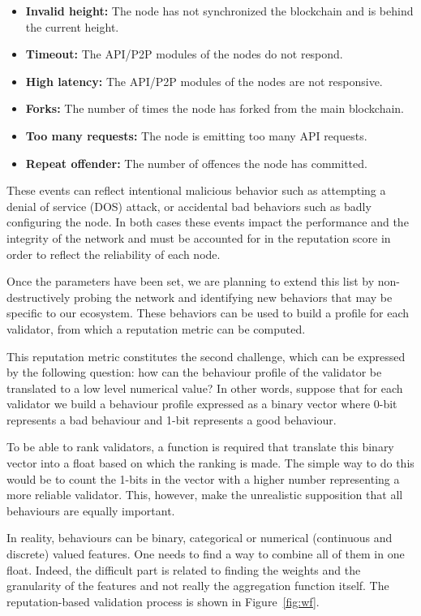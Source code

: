 \begin{itemize}
    \item \textbf{Invalid height:} The node has not synchronized the blockchain and is behind the current height. 
    \item \textbf{Timeout:} The API/P2P modules of the nodes do not respond.
    \item \textbf{High latency:} The API/P2P modules of the nodes are not responsive.
    \item \textbf{Forks:} The number of times the node has forked from the main blockchain.
    \item \textbf{Too many requests:} The node is emitting too many API requests.
    \item \textbf{Repeat offender:} The number of offences the node has committed.
\end{itemize}
 
These events can reflect intentional malicious behavior such as attempting a denial of service (DOS) attack, or accidental bad behaviors such as badly configuring the node. In both cases these events impact the performance and the integrity of the network and must be accounted for in the reputation score in order to reflect the reliability of each node.   

Once the parameters have been set, we are planning to extend this list by non-destructively probing the network and identifying new behaviors that may be specific to our ecosystem. These behaviors can be used to build a profile for each validator, from which a reputation metric can be computed. 

This reputation metric constitutes the second challenge, which can be expressed by the following question: how can the behaviour profile of the validator be translated to a low level numerical value? In other words, suppose that for each validator we build a behaviour profile expressed as a binary vector where 0-bit represents a bad behaviour and 1-bit represents a good behaviour. 

To be able to rank validators, a function is required that translate this binary vector into a float based on which the ranking is made. The simple way to do this would be to count the 1-bits in the vector with a higher number representing a more reliable validator. This, however, make the unrealistic supposition that all behaviours are equally important. 

In reality, behaviours can be binary, categorical or numerical (continuous and discrete) valued features. One needs to find a way to combine all of them in one float. Indeed, the difficult part is related to finding the weights and the granularity of the features and not really the aggregation function itself. The reputation-based validation process is shown in Figure~\ref{fig:wf}.

